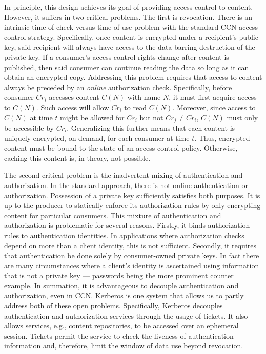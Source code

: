\documentclass[conference]{IEEEtran}
\begin{document}
In principle, this design achieves its goal of providing access control to content.
However, it suffers in two critical problems. The first is revocation. There is an
intrinsic time-of-check versus time-of-use problem with the standard CCN access
control strategy. Specifically, once content is encrypted under a recipient’s
public key, said recipient will always have access to the data barring destruction
of the private key. If a consumer’s access control rights change after content
is published, then said consumer can continue reading the data so long as it can
obtain an encrypted copy. Addressing this problem requires that access to content
always be preceded by an \emph{online} authorization check. Specifically, before
consumer $Cr_i$ accesses content $C(N)$ with name $N$, it must first acquire access
to $C(N)$. Such access will allow $Cr_i$ to read $C(N)$. Moreover, since access to
$C(N)$ at time $t$ might be allowed for $Cr_i$ but not $Cr_j \not= Cr_i$, $C(N)$ must
only be accessible by $Cr_i$. Generalizing this further means that each content is
uniquely encrypted, on demand, for each consumer at time $t$. Thus, encrypted content
must be bound to the state of an access control policy. Otherwise, caching this
content is, in theory, not possible.

The second critical problem is the inadvertent mixing of authentication and authorization.
In the standard approach, there is not online authentication or authorization. Possession
of a private key sufficiently satisfies both purposes. It is up to the producer to
statically enforce its authorization rules by only encrypting content for particular
consumers. This mixture of authentication and authorization is problematic for several
reasons. Firstly, it binds authorization rules to authentication identities. In
applications where authorization checks depend on more than a client identity, this is
not sufficient. Secondly, it requires that authentication be done solely by consumer-owned
private keys. In fact there are many circumstances where a client’s identity is ascertained
using information that is not a private key — passwords being the more prominent counter
example. In summation, it is advantageous to decouple authentication and authorization,
even in CCN. Kerberos is one system that allows us to partly address both of these open
problems. Specifically, Kerberos decouples authentication and authorization services
through the usage of tickets. It also allows services, e.g., content repositories, to
be accessed over an ephemeral session. Tickets permit the service to check the liveness
of authentication information and, therefore, limit the window of data use beyond revocation.
\end{document}
